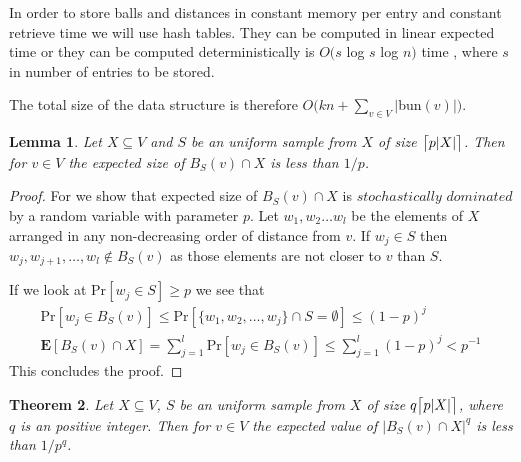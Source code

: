 \documentclass[shortabstract, lic, english]{iithesis}
\theoremstyle{definition} \newtheorem{definition}{Definition}[chapter]
\theoremstyle{plain} \newtheorem{remark}[definition]{Observation}
\theoremstyle{plain} \newtheorem{theorem}[definition]{Theorem}
\theoremstyle{plain} \newtheorem{lemma}[definition]{Lemma}
\theoremstyle{plain} \newtheorem{conjecture}[definition]{Conjecture}
\DeclarePairedDelimiter{\ceil}{\lceil}{\rceil}
\begin{document}
In order to store balls and distances in constant memory per entry and constant retrieve time we will use hash tables.
They can be computed in linear expected time \cite{2LevelHashTable} or
they can be computed deterministically is $O(s $ log $ s $ log $ n)$ time \cite{hashTableDerandomization}, where $s$ in number of entries to be stored.

The total size of the data structure is therefore $O(kn + \sum_{v \in V}|$bun$(v)|)$.

\begin{lemma} \label{ballSize}
    Let $X \subseteq V$ and $S$ be an uniform sample from $X$ of size $\ceil[\big]{p|X|}$.
    Then for $v \in V$ the expected size of $B_{S}(v) \cap X$ is less than $1/p$.
\end{lemma}

\begin{proof}
    For we show that expected size of $B_{S}(v) \cap X$ is
    $stochastically$ $dominated$ by a random variable with parameter $p$.
    Let $w_1, w_2 \ldots w_l$ be the elements of $X$ arranged in any non-decreasing order of distance from $v$.
    If $w_j \in S$ then $w_j, w_{j+1}, \ldots , w_l \notin B_{S}(v)$
    as those elements are not closer to $v$ than $S$.

    If we look at Pr$[w_j \in S] \geq p$ we see that
    \begin{align}
        \text{Pr}[w_j \in B_{S}(v)] \leq
        \text{Pr}[\{w_1, w_2, \ldots, w_j\} \cap S = \emptyset] \leq (1 - p)^j \nonumber \\
        \mathbf{E}[B_{S}(v) \cap X] = \sum_{j=1}^{l} \text{Pr}[w_j \in B_{S}(v)] \leq \sum_{j=1}^{l}(1-p)^j < p^{-1} \nonumber
    \end{align}
    This concludes the proof.
\end{proof}

\begin{theorem} \label{ballSizeStrong}
    Let $X \subseteq V$, $S$ be an uniform sample from $X$ of size $q\ceil[\big]{p|X|}$, where $q$ is an positive integer.
    Then for $v \in V$ the expected value of $|B_{S}(v) \cap X|^q$ is less than $1/p^q$.
\end{theorem}
\end{document}
